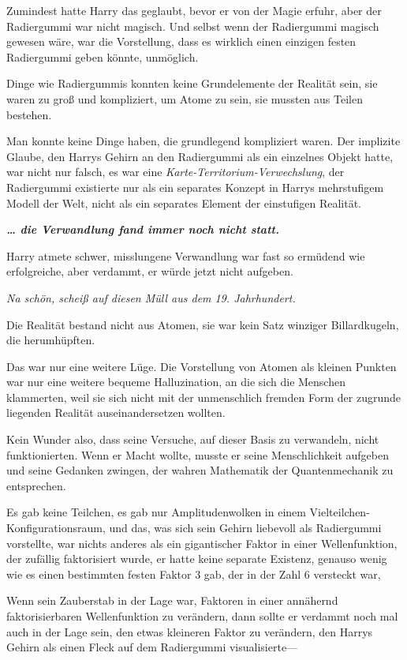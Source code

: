 {Zumindest hatte Harry das geglaubt, bevor er von der Magie erfuhr, aber der Radiergummi war nicht magisch. Und selbst wenn der Radiergummi magisch gewesen wäre, war die Vorstellung, dass es wirklich einen einzigen festen Radiergummi geben könnte, unmöglich.

Dinge wie Radiergummis konnten keine Grundelemente der Realität sein, sie waren zu groß und kompliziert, um Atome zu sein, sie mussten aus Teilen bestehen.

Man konnte keine Dinge haben, die grundlegend kompliziert waren. Der implizite Glaube, den Harrys Gehirn an den Radiergummi als ein einzelnes Objekt hatte, war nicht nur falsch, es war eine \emph{Karte-Territorium-Verwechslung}, der Radiergummi existierte nur als ein separates Konzept in Harrys mehrstufigem Modell der Welt, nicht als ein separates Element der einstufigen Realität.

\textbf{\emph{… die Verwandlung fand immer noch nicht statt.}}

Harry atmete schwer, misslungene Verwandlung war fast so ermüdend wie erfolgreiche, aber verdammt, er würde jetzt nicht aufgeben.

\emph{Na schön, scheiß auf diesen Müll aus dem 19. Jahrhundert.}

Die Realität bestand nicht aus Atomen, sie war kein Satz winziger Billardkugeln, die herumhüpften.

Das war nur eine weitere Lüge. Die Vorstellung von Atomen als kleinen Punkten war nur eine weitere bequeme Halluzination, an die sich die Menschen klammerten, weil sie sich nicht mit der unmenschlich fremden Form der zugrunde liegenden Realität auseinandersetzen wollten.

Kein Wunder also, dass seine Versuche, auf dieser Basis zu verwandeln, nicht funktionierten. Wenn er Macht wollte, musste er seine Menschlichkeit aufgeben und seine Gedanken zwingen, der wahren Mathematik der Quantenmechanik zu entsprechen.

Es gab keine Teilchen, es gab nur Amplitudenwolken in einem Vielteilchen-Konfigurationsraum, und das, was sich sein Gehirn liebevoll als Radiergummi vorstellte, war nichts anderes als ein gigantischer Faktor in einer Wellenfunktion, der zufällig faktorisiert wurde, er hatte keine separate Existenz, genauso wenig wie es einen bestimmten festen Faktor 3 gab, der in der Zahl 6 versteckt war,

Wenn sein Zauberstab in der Lage war, Faktoren in einer annähernd faktorisierbaren Wellenfunktion zu verändern, dann sollte er verdammt noch mal auch in der Lage sein, den etwas kleineren Faktor zu verändern, den Harrys Gehirn als einen Fleck auf dem Radiergummi visualisierte—

}
